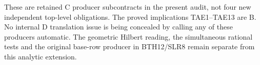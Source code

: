 These are retained C producer subcontracts in the present
audit, not four new independent top-level obligations.
The proved implications TAE1--TAE13 are B.
No internal D translation issue is being concealed by
calling any of these producers automatic.
The geometric Hilbert reading, the simultaneous rational
tests and the original base-row producer in BTH12/SLR8
remain separate from this analytic extension.
